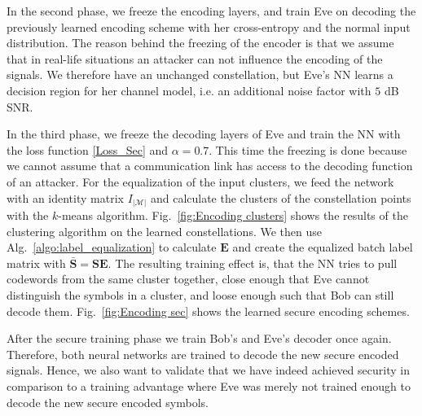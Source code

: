 \documentclass[conference]{IEEEtran}
\begin{document}
In the second phase, we freeze the encoding layers, and train Eve on decoding the previously learned encoding scheme with her cross-entropy and the normal input distribution. The reason behind the freezing of the encoder is that we assume that in real-life situations an attacker can not influence the encoding of the signals. We therefore have an unchanged constellation, but Eve's NN learns a decision region for her channel model, i.e. an additional noise factor with $5$ dB SNR.

In the third phase, we freeze the decoding layers of Eve and train the NN with the loss function \eqref{Loss_Sec} and $\alpha=0.7$. This time the freezing is done because we cannot assume that a communication link has access to the decoding function of an attacker. For the equalization of the input clusters, we feed the network with an identity matrix $I_{|\mathcal{M}|}$ and calculate the clusters of the constellation points with the $k$-means algorithm. Fig.~\ref{fig:Encoding clusters} shows the results of the clustering algorithm on the learned constellations. We then use Alg.~\ref{algo:label_equalization} to calculate $\mathbf{E}$ and create the equalized batch label matrix with $\bar{\mathbf{S}}=\mathbf{S}\mathbf{E}$. The resulting training effect is, that the NN tries to pull codewords from the same cluster together, close enough that Eve cannot distinguish the symbols in a cluster, and loose enough such that Bob can still decode them. Fig.~\ref{fig:Encoding sec} shows the learned secure encoding schemes.

After the secure training phase we train Bob's and Eve's decoder once again. Therefore, both neural networks are trained to decode the new secure encoded signals. Hence, we also want to validate that we have indeed achieved security in comparison to a training advantage where Eve was merely not trained enough to decode the new secure encoded symbols.
\end{document}
